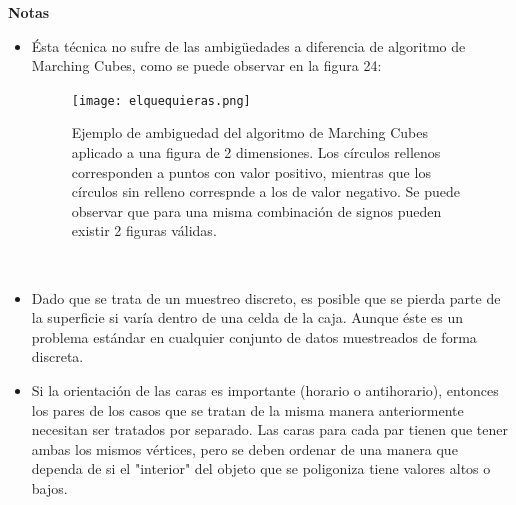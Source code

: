 \documentclass[12pt]{article}
\begin{document}
\textbf{Notas}
\begin{itemize}
\item Ésta técnica no sufre de las ambigüedades a diferencia de algoritmo de Marching Cubes, como se puede observar en la figura 24:
\begin{figure}[h!]
\texttt{[image: elquequieras.png]}
\caption{Ejemplo de ambiguedad del algoritmo de Marching Cubes aplicado a una figura de 2 dimensiones. Los círculos rellenos corresponden a puntos con valor positivo, mientras que los círculos sin relleno correspnde a los de valor negativo. Se puede observar que para una misma combinación de signos pueden existir 2 figuras válidas.}
\end{figure}\\
\item Dado que se trata de un muestreo discreto, es posible que se pierda parte de la superficie si varía dentro de una celda de la caja. Aunque éste es un problema estándar en cualquier conjunto de datos muestreados de forma discreta.
\item Si la orientación de las caras es importante (horario o antihorario), entonces los pares de los casos que se tratan de la misma manera anteriormente necesitan ser tratados por separado. Las caras para cada par tienen que tener ambas los mismos vértices, pero se deben ordenar de una manera que dependa de si el "interior" del objeto que se poligoniza tiene valores altos o bajos.
\end{itemize}
\end{document}
